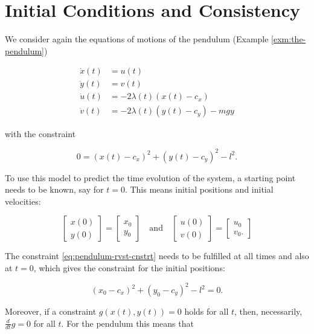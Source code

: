 \documentclass[]{book}
\theoremstyle{definition}
\theoremstyle{definition}
\theoremstyle{definition}
\theoremstyle{remark}
\begin{document}
\section{Initial Conditions and
Consistency}\label{initial-conditions-and-consistency}

We consider again the equations of motions of the pendulum (Example
\ref{exm:the-pendulum})

\begin{align*}
    \dot x(t) &= u(t) \\
    \dot y(t) &= v(t) \\
    \dot u(t) &= - 2 \lambda(t) (x(t) - c_x) \\ 
    \dot v(t) &= - 2 \lambda(t) (y(t) - c_y) - mgy
\end{align*}

with the constraint

\begin{equation}
    0=(x(t) - c_x)^2 + (y(t) - c_y)^2 - l^2. \label{eq:pendulum-rvst-cnstrt}
\end{equation}

To use this model to predict the time evolution of the system, a
starting point needs to be known, say for \(t=0\). This means initial
positions and initial velocities:

\[
\begin{bmatrix} 
x(0) \\ y(0)
\end{bmatrix}
=
\begin{bmatrix} 
    x_0 \\ y_0
\end{bmatrix}
\quad\text{and}\quad
\begin{bmatrix} 
u(0) \\ v(0)
\end{bmatrix}
=
\begin{bmatrix} 
    u_0 \\ v_0.
\end{bmatrix}
\]

The constraint \eqref{eq:pendulum-rvst-cnstrt} needs to be fulfilled at
all times and also at \(t=0\), which gives the constraint for the
initial positions:

\begin{equation*}
    (x_0 - c_x)^2 + (y_0 - c_y)^2 - l^2=0.
\end{equation*}

Moreover, if a constraint \(g(x(t), y(t))=0\) holds for all \(t\), then,
necessarily, \(\frac{d}{dt}g=0\) for all \(t\). For the pendulum this
means that
\end{document}
